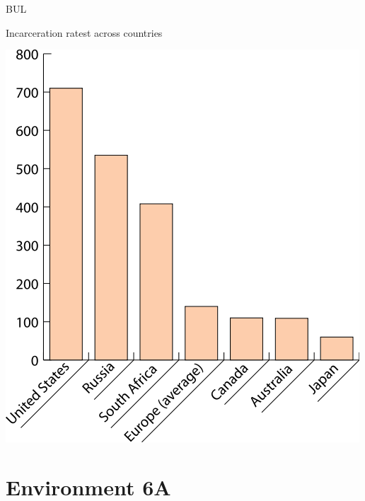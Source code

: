 \begin{chart}{B}{UL}
\caption{Incarceration ratest across countries}
\label{chart:incarceration}
\includegraphics[width=\chartwidth,height=\chartheight]{incarceration}  
\end{chart}



\section{Environment 6A}

\lipsum[1-4]


